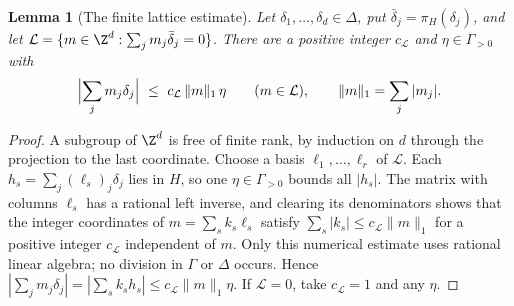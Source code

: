 \documentclass[11pt]{article}
\theoremstyle{plain}
\newtheorem{lemma}[lemma]{Lemma}
\theoremstyle{plain}
\theoremstyle{plain}
\theoremstyle{definition}
\theoremstyle{definition}
\theoremstyle{definition}
\theoremstyle{definition}
\theoremstyle{remark}
\begin{document}
\begin{lemma}[The finite lattice estimate]\label{ent:mv:lem:lattice}
Let $\delta_1,\ldots,\delta_d\in\Delta$, put $\bar\delta_j=\pi_H(\delta_j)$,
and let $\mathcal L=\{m\in\Z^d:\sum_jm_j\bar\delta_j=0\}$. There are a
positive integer $c_{\mathcal L}$ and $\eta\in\Gamma_{>0}$ with
\begin{equation}\label{ent:mv:eq:lattice}
 \Bigl|\sum_jm_j\delta_j\Bigr|\ \le\ c_{\mathcal L}\,\|m\|_1\,\eta
 \qquad(m\in\mathcal L),\qquad \|m\|_1=\sum_j|m_j|.
\end{equation}
\end{lemma}
\begin{proof}
A subgroup of $\Z^d$ is free of finite rank, by induction on $d$ through the
projection to the last coordinate. Choose a basis $\ell_1,\ldots,\ell_r$ of
$\mathcal L$. Each $h_s=\sum_j(\ell_s)_j\delta_j$ lies in $H$, so one
$\eta\in\Gamma_{>0}$ bounds all $|h_s|$. The matrix with columns $\ell_s$ has
a rational left inverse, and clearing its denominators shows that the
integer coordinates of $m=\sum_sk_s\ell_s$ satisfy
$\sum_s|k_s|\le c_{\mathcal L}\|m\|_1$ for a positive integer
$c_{\mathcal L}$ independent of $m$. Only this numerical estimate uses
rational linear algebra; no division in $\Gamma$ or $\Delta$ occurs. Hence
$|\sum_jm_j\delta_j|=|\sum_sk_sh_s|\le c_{\mathcal L}\|m\|_1\eta$. If
$\mathcal L=0$, take $c_{\mathcal L}=1$ and any $\eta$.
\end{proof}
\end{document}
